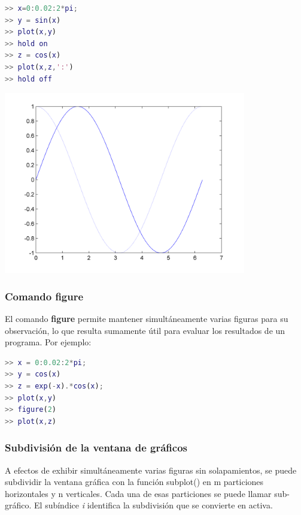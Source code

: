 \begin{lstlisting}[language=Matlab]
>> x=0:0.02:2*pi; 
>> y = sin(x) 
>> plot(x,y) 
>> hold on 
>> z = cos(x) 
>> plot(x,z,':') 
>> hold off
\end{lstlisting}
\begin{center}
\includegraphics[width=300pt]{./Imagenes/holdon.png}
\end{center}

\subsubsection{Comando figure}

El comando \textbf{figure} permite mantener simultáneamente varias figuras para su observación, lo que resulta sumamente útil para evaluar los resultados de un programa. Por ejemplo:

\begin{lstlisting}[language=Matlab]
>> x = 0:0.02:2*pi; 
>> y = cos(x) 
>> z = exp(-x).*cos(x); 
>> plot(x,y) 
>> figure(2) 
>> plot(x,z) 
\end{lstlisting}

\subsubsection{Subdivisión de la ventana de gráficos}

A efectos de exhibir simultáneamente varias figuras sin solapamientos, se puede subdividir la 
ventana gráfica con la función subplot() en m particiones horizontales y n verticales. Cada una de esas particiones se puede llamar sub-gráfico. El subíndice \textit{i} identifica la subdivisión que se convierte en activa.

